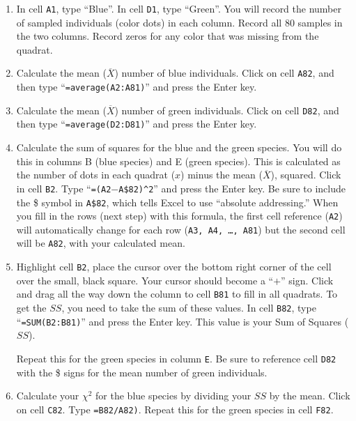 \documentclass[12pt, hidelinks]{exam}
\newcommand\chisq{$\chi^2$}
\begin{document}
\begin{enumerate}

\item In cell \texttt{A1}, type ``Blue''. In cell \texttt{D1}, type ``Green''. You will record the number of sampled individuals (color dots) in each column. Record all 80 samples in the two columns. Record zeros for any color that was missing from the quadrat.

\item Calculate the mean ($\overline{X}$) number of blue individuals. Click on cell \texttt{A82}, and then type
``\texttt{=average(A2:A81)}'' and press the Enter key.

\item Calculate the mean  ($\overline{X}$) number of green individuals. Click on cell \texttt{D82}, and then type
``\texttt{=average(D2:D81)}'' and press the Enter key.

\item Calculate the sum of squares for the blue and the green species. You will do this in
columns B (blue species) and E (green species). This is calculated as the number of dots in each quadrat ($x$) minus the mean ($\overline{X}$),
squared. Click in cell \texttt{B2}. Type ``\texttt{=(A2$-$A\$82)\textasciicircum2}'' and press the Enter key. 
Be sure to include the \$ symbol in \texttt{A\$82}, which tells Excel to use ``absolute addressing.'' When you fill in the rows (next step) with this formula, the first cell reference (\texttt{A2}) will automatically change for each row (\texttt{A3,\,A4,\,\ldots,\,A81}) but the second cell will be \texttt{A82}, with your calculated mean. 

\item Highlight cell \texttt{B2}, place the cursor over the bottom right corner of
the cell over the small, black square. Your cursor should become a ``$+$''
sign. Click and drag all the way down the column to cell \texttt{B81} to fill
in all quadrats.  To get the $SS$, you need to take the sum of these
values. In cell \texttt{B82}, type ``\texttt{=SUM(B2:B81)}'' and press the Enter key. This value is your Sum of Squares ($SS$).

Repeat this for the green species in column \texttt{E}. Be sure to reference cell \texttt{D82} with the \$ signs for the mean number of green individuals.

\item Calculate your \chisq{} for the blue species by dividing your $SS$ by the mean. Click on cell \texttt{C82}. Type \texttt{=B82/A82)}. Repeat this for the green species in cell \texttt{F82}.


\end{enumerate}
\end{document}
